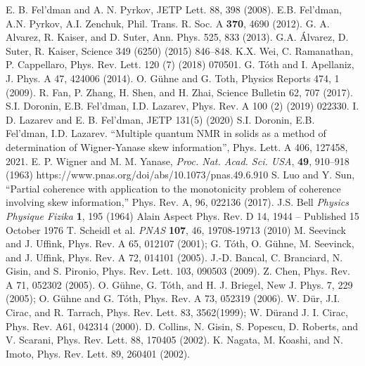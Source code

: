 \begin{thebibliography}{}
  E. B. Fel'dman and A. N. Pyrkov, JETP Lett. 88, 398 (2008).
  E.B. Fel'dman, A.N. Pyrkov, A.I. Zenchuk, Phil. Trans. R. Soc. A {\bf 370}, 4690 (2012).
  G. A. Alvarez, R. Kaiser, and D. Suter, Ann. Phys. 525, 833 (2013).
  G.A. Álvarez, D. Suter, R. Kaiser, Science 349 (6250) (2015) 846–848.
  K.X. Wei, C. Ramanathan, P. Cappellaro, Phys. Rev. Lett. 120 (7) (2018) 070501.
  G. T\'oth and I. Apellaniz, J. Phys. A 47, 424006 (2014).
  O. G\"uhne and G. Toth, Physics Reports 474, 1 (2009).
  R. Fan, P. Zhang, H. Shen, and H. Zhai, Science Bulletin 62, 707 (2017).
  S.I. Doronin, E.B. Fel’dman, I.D. Lazarev, Phys. Rev. A 100 (2) (2019) 022330.
  I. D. Lazarev and E. B. Fel'dman, JETP 131(5) (2020)
  S.I. Doronin, E.B. Fel’dman, I.D. Lazarev. “Multiple quantum NMR in solids as a method of determination of Wigner-Yanase skew information”, Phys. Lett. A 406, 127458, 2021.
  E. P. Wigner and M. M. Yanase, \textit{Proc. Nat. Acad. Sci. USA}, \textbf{49}, 910–918 (1963) https://www.pnas.org/doi/abs/10.1073/pnas.49.6.910
  S. Luo and Y. Sun, “Partial coherence with application to the monotonicity problem of coherence involving skew information,” Phys. Rev. A, 96, 022136 (2017).
  J.S. Bell \textit{Physics Physique Fizika} \textbf{1}, 195 (1964)
  Alain Aspect Phys. Rev. D 14, 1944 – Published 15 October 1976
  T. Scheidl et al. \textit{PNAS} \textbf{107}, 46, 19708-19713 (2010)
  M. Seevinck and J. Uffink, Phys. Rev. A 65, 012107 (2001);
  G. T\'oth, O. G\"uhne, M. Seevinck, and J. Uffink, Phys. Rev. A 72, 014101 (2005).
  J.-D. Bancal, C. Branciard, N. Gisin, and S. Pironio, Phys. Rev. Lett. 103, 090503 (2009).
  Z. Chen, Phys. Rev. A 71, 052302 (2005).
  O. G\"uhne, G. T\'oth, and H. J. Briegel, New J. Phys. 7, 229 (2005);
   O. G\"uhne and G. T\'oth, Phys. Rev. A 73, 052319 (2006).
  W. D\"ur, J.I. Cirac, and R. Tarrach, Phys. Rev. Lett. 83, 3562(1999);
  W. D\"urand J. I. Cirac, Phys. Rev. A61, 042314 (2000).
  D. Collins, N. Gisin, S. Popescu, D. Roberts, and V. Scarani, Phys. Rev. Lett. 88, 170405 (2002).
  K. Nagata, M. Koashi, and N. Imoto, Phys. Rev. Lett. 89, 260401 (2002).

\end{thebibliography}
